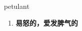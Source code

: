 
\begin{frame}
{\huge petulant}
\begin{center}
\begin{enumerate}\Large
  \item \textbf{易怒的，爱发脾气的}
\end{enumerate}
\end{center}
\end{frame}
